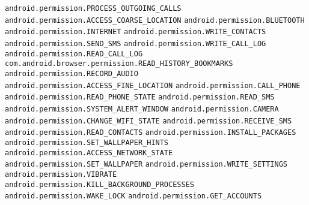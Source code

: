 \texttt{android.permission.PROCESS\_OUTGOING\_CALLS}
\newline \texttt{android.permission.ACCESS\_COARSE\_LOCATION}
\newline \texttt{android.permission.BLUETOOTH}
\newline \texttt{android.permission.INTERNET}
\newline \texttt{android.permission.WRITE\_CONTACTS}
\newline \texttt{android.permission.SEND\_SMS}
\newline \texttt{android.permission.WRITE\_CALL\_LOG}
\newline \texttt{android.permission.READ\_CALL\_LOG}
\newline \texttt{com.android.browser.permission.READ\_HISTORY\_BOOKMARKS}
\newline \texttt{android.permission.RECORD\_AUDIO}
\newline \texttt{android.permission.ACCESS\_FINE\_LOCATION}
\newline \texttt{android.permission.CALL\_PHONE}
\newline \texttt{android.permission.READ\_PHONE\_STATE}
\newline \texttt{android.permission.READ\_SMS}
\newline \texttt{android.permission.SYSTEM\_ALERT\_WINDOW}
\newline \texttt{android.permission.CAMERA}
\newline \texttt{android.permission.CHANGE\_WIFI\_STATE}
\newline \texttt{android.permission.RECEIVE\_SMS}
\newline \texttt{android.permission.READ\_CONTACTS}
\newline \texttt{android.permission.INSTALL\_PACKAGES}
\newline \texttt{android.permission.SET\_WALLPAPER\_HINTS}
\newline \texttt{android.permission.ACCESS\_NETWORK\_STATE}
\newline \texttt{android.permission.SET\_WALLPAPER}
\newline \texttt{android.permission.WRITE\_SETTINGS}
\newline \texttt{android.permission.VIBRATE}
\newline \texttt{android.permission.KILL\_BACKGROUND\_PROCESSES}
\newline \texttt{android.permission.WAKE\_LOCK}
\newline \texttt{android.permission.GET\_ACCOUNTS}

